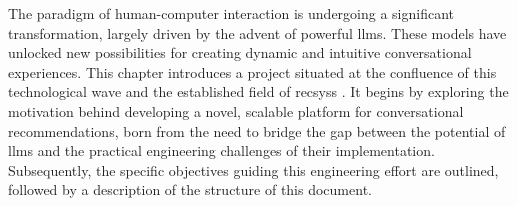 The paradigm of human-computer interaction is undergoing a significant transformation, largely driven by the advent of powerful \acp{llm}. These models have unlocked new possibilities for creating dynamic and intuitive conversational experiences. This chapter introduces a project situated at the confluence of this technological wave and the established field of \acl{recsys}s \cite{BOOK:RS-HANDBOOK}. It begins by exploring the motivation behind developing a novel, scalable platform for conversational recommendations, born from the need to bridge the gap between the potential of \acp{llm} and the practical engineering challenges of their implementation. Subsequently, the specific objectives guiding this engineering effort are outlined, followed by a description of the structure of this document.